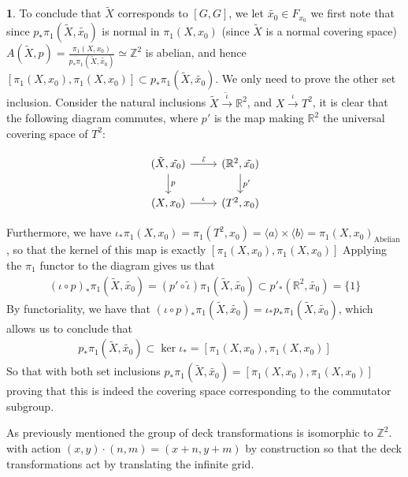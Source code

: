\documentclass[10.5pt]{article}
\theoremstyle{definition}
\newtheorem{pb}{}
\newcommand{\set}[1]{\{#1\}}
\newcommand{\gen}[1]{\langle #1 \rangle}
\begin{document}
\begin{pb}
        To conclude that \(\tilde{X}\) corresponds to \([G,G]\), we let \(\tilde{x_0} \in F_{x_0}\)
        we first note that since \(p_*\pi_1(\tilde{X},\tilde{x_0})\) is normal in \(\pi_1(X,x_0)\) (since \(\tilde{X}\) is a normal covering space) \(A(\tilde{X},p) = \frac{\pi_1(X,x_0)}{p_*\pi_1(\tilde{X},\tilde{x_0})} \simeq \mathbb{Z}^2\) is abelian, and hence \([\pi_1(X,x_0),\pi_1(X,x_0)] \subset p_*\pi_1(\tilde{X},\tilde{x_0})\). We only need to prove the other set inclusion. Consider the natural inclusions \(\tilde{X} \overset{\tilde{\iota}}{\to} \mathbb{R}^2\), and \(X \overset{\iota}{\to} T^2\), it is clear that the following diagram commutes, where \(p'\) is the map making \(\mathbb{R}^2\) the universal covering space of \(T^2\):

        \begin{equation*} 
            \begin{tikzcd}
                (\tilde{X},\tilde{x_0})\arrow[r, "\tilde{\iota}"] \arrow[d, "p"]& (\mathbb{R}^2,\tilde{x_0})\arrow[d, "p'"]\\
                (X,x_0)\arrow[r, "\iota"]& (T^2,x_0)
            \end{tikzcd}
        \end{equation*}

        Furthermore, we have \(\iota_*\pi_1(X,x_0) = \pi_1(T^2,x_0) = \gen{a} \times \gen{b} = \pi_1(X,x_0)_{\text{Abelian}}\), so that the kernel of this map is exactly \newline \([\pi_1(X,x_0),\pi_1(X,x_0)]\)
        Applying the \(\pi_1\) functor to the diagram gives us that
        \begin{align*}
            (\iota \circ p)_*\pi_1(\tilde{X},\tilde{x_0}) = (p'\circ \tilde{\iota})\pi_1(\tilde{X},\tilde{x_0}) \subset p'_* (\mathbb{R}^2,\tilde{x_0}) = \set{1}
        \end{align*}
        By functoriality, we have that \( (\iota \circ p)_*\pi_1(\tilde{X},\tilde{x_0}) = \iota_* p_* \pi_1(\tilde{X},\tilde{x_0})\), which allows us to conclude that
        \begin{align*}
            p_*\pi_1(\tilde{X},\tilde{x_0}) \subset \ker \iota_* = [\pi_1(X,x_0),\pi_1(X,x_0)]
        \end{align*}
        So that with both set inclusions \(p_*\pi_1(\tilde{X},\tilde{x_0}) = [\pi_1(X,x_0),\pi_1(X,x_0)]\) proving that this is indeed the covering space corresponding to the commutator subgroup.

        As previously mentioned the group of deck transformations is isomorphic to \(\mathbb{Z}^2\). with action \((x,y)\cdot (n,m) = (x+n,y+m)\) by construction so that the deck transformations act by translating the infinite grid.

    \end{pb}
\end{document}
